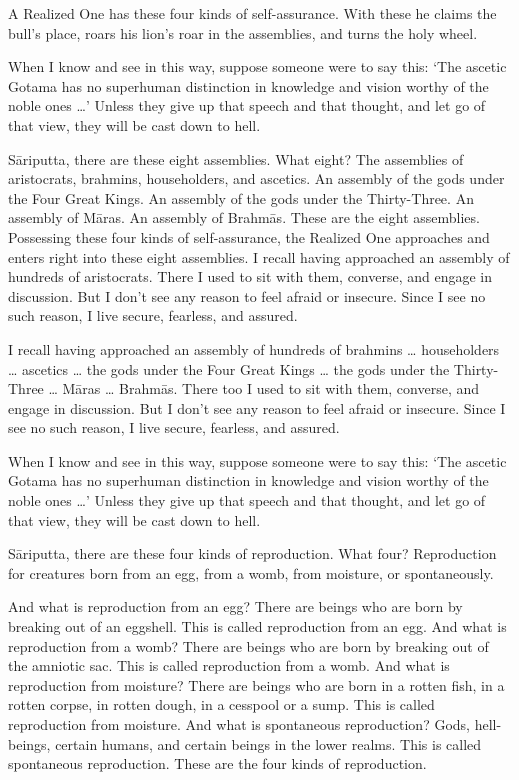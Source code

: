 \documentclass[12pt,openany]{book}%
\begin{document}
A Realized One has these four kinds of self-assurance. With these he claims the bull’s place, roars his lion’s roar in the assemblies, and turns the holy wheel. 

When I know and see in this way, suppose someone were to say this: ‘The ascetic Gotama has no superhuman distinction in knowledge and vision worthy of the noble ones …’ Unless they give up that speech and that thought, and let go of that view, they will be cast down to hell. 

\textsanskrit{Sāriputta}, there are these eight assemblies. What eight? The assemblies of aristocrats, brahmins, householders, and ascetics. An assembly of the gods under the Four Great Kings. An assembly of the gods under the Thirty-Three. An assembly of \textsanskrit{Māras}. An assembly of \textsanskrit{Brahmās}. These are the eight assemblies. Possessing these four kinds of self-assurance, the Realized One approaches and enters right into these eight assemblies. I recall having approached an assembly of hundreds of aristocrats. There I used to sit with them, converse, and engage in discussion. But I don’t see any reason to feel afraid or insecure. Since I see no such reason, I live secure, fearless, and assured. 

I recall having approached an assembly of hundreds of brahmins … householders … ascetics … the gods under the Four Great Kings … the gods under the Thirty-Three … \textsanskrit{Māras} … \textsanskrit{Brahmās}. There too I used to sit with them, converse, and engage in discussion. But I don’t see any reason to feel afraid or insecure. Since I see no such reason, I live secure, fearless, and assured. 

When I know and see in this way, suppose someone were to say this: ‘The ascetic Gotama has no superhuman distinction in knowledge and vision worthy of the noble ones …’ Unless they give up that speech and that thought, and let go of that view, they will be cast down to hell. 

\textsanskrit{Sāriputta}, there are these four kinds of reproduction. What four? Reproduction for creatures born from an egg, from a womb, from moisture, or spontaneously. 

And what is reproduction from an egg? There are beings who are born by breaking out of an eggshell. This is called reproduction from an egg. And what is reproduction from a womb? There are beings who are born by breaking out of the amniotic sac. This is called reproduction from a womb. And what is reproduction from moisture? There are beings who are born in a rotten fish, in a rotten corpse, in rotten dough, in a cesspool or a sump. This is called reproduction from moisture. And what is spontaneous reproduction? Gods, hell-beings, certain humans, and certain beings in the lower realms. This is called spontaneous reproduction. These are the four kinds of reproduction. 
\end{document}
